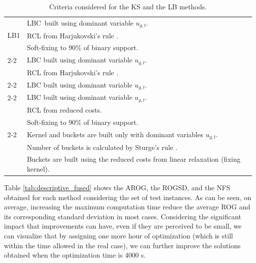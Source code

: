 \begin{table}[htpb]
\centering
\small
\caption{Criteria considered for the KS and the LB methods.}\label{tab:methods}
\begin{tabular}{p{1.5cm}ll}\toprule
\multirow{3}{*}{LB1} 
& LBC\tnote{1}~built using dominant variable $u_{g,t}$. \\
& RCL from Harjukovski's rule \citep{Harjunkoski2021}. \\
& Soft-fixing to 90\% of binary support. \\ 
\cmidrule{2-2}
\multirow{2}{*}{LB2} 
& LBC built using dominant variable $u_{g,t}$. \\
& RCL from Harjukovski's rule \citep{Harjunkoski2021}. \\ 
\cmidrule{2-2}
\multirow{1}{*}{LB3} 
& LBC built using dominant variable $u_{g,t}$. \\  
\cmidrule{2-2}
\multirow{3}{*}{LB4} 
& LBC built using dominant variable $u_{g,t}$. \\
& RCL from reduced costs. \\ 
& Soft-fixing to 90\% of binary support. \\ 
\cmidrule{2-2}
\multirow{4}{*}{KS} 
& Kernel and buckets are built only with dominant variables $u_{g,t}$. \\
& Number of buckets is calculated by Sturge's rule \citep{Scott2009}. \\
& Buckets are built using the reduced costs from linear relaxation (fixing kernel). \\
\bottomrule
\end{tabular}
\end{table}

Table \ref{tab:descriptive_fused} shows the AROG, the ROGSD, and the NFS obtained for each method considering the set of test instances. As can be seen, on average, increasing the maximum computation time reduce the average ROG and its corresponding standard deviation in most cases. Considering the significant impact that improvements can have, even if they are perceived to be small, we can visualize that by assigning one more hour of optimization (which is still within the time allowed in the real case), we can further improve the solutions obtained when the optimization time is 4000 s.

